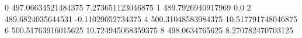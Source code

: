 0 497.06634521484375 7.273651123046875
1 489.7926940917969 0.0
2 489.6824035644531 -0.11029052734375
4 500.31048583984375 10.517791748046875
6 500.51763916015625 10.724945068359375
8 498.0634765625 8.270782470703125
